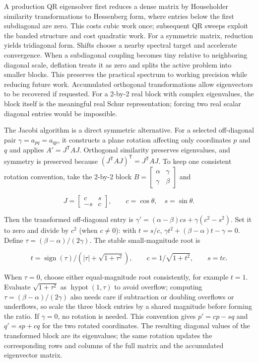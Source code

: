 A production QR eigensolver first reduces a dense matrix by Householder similarity transformations to Hessenberg form, where entries below the first subdiagonal are zero. This costs cubic work once; subsequent QR sweeps exploit the banded structure and cost quadratic work. For a symmetric matrix, reduction yields tridiagonal form. Shifts choose a nearby spectral target and accelerate convergence. When a subdiagonal coupling becomes tiny relative to neighboring diagonal scale, deflation treats it as zero and splits the active problem into smaller blocks. This preserves the practical spectrum to working precision while reducing future work. Accumulated orthogonal transformations allow eigenvectors to be recovered if requested. For a 2-by-2 real block with complex eigenvalues, the block itself is the meaningful real Schur representation; forcing two real scalar diagonal entries would be impossible.

The Jacobi algorithm is a direct symmetric alternative. For a selected off-diagonal pair \(\gamma=a_{pq}=a_{qp}\), it constructs a plane rotation affecting only coordinates \(p\) and \(q\) and applies \(A'=J^\mathsf TAJ\). Orthogonal similarity preserves eigenvalues, and symmetry is preserved because \((J^\mathsf TAJ)^\mathsf T=J^\mathsf TAJ\). To keep one consistent rotation convention, take the 2-by-2 block \(B=\begin{bmatrix}\alpha&\gamma\\\gamma&\beta\end{bmatrix}\) and

\[
J=\begin{bmatrix}c&s\\-s&c\end{bmatrix},\qquad c=\cos\theta,\quad s=\sin\theta.
\]

Then the transformed off-diagonal entry is \(\gamma'=(\alpha-\beta)cs+\gamma(c^2-s^2)\). Set it to zero and divide by \(c^2\) (when \(c\ne0\)): with \(t=s/c\), \(\gamma t^2+(\beta-\alpha)t-\gamma=0\). Define \(\tau=(\beta-\alpha)/(2\gamma)\). The stable small-magnitude root is

\[
t=\operatorname{sign}(\tau)\big/(|\tau|+\sqrt{1+\tau^2}),\qquad c=1/\sqrt{1+t^2},\qquad s=tc.
\]

When \(\tau=0\), choose either equal-magnitude root consistently, for example \(t=1\). Evaluate \(\sqrt{1+\tau^2}\) as \(\operatorname{hypot}(1,\tau)\) to avoid overflow; computing \(\tau=(\beta-\alpha)/(2\gamma)\) also needs care if subtraction or doubling overflows or underflows, so scale the three block entries by a shared magnitude before forming the ratio. If \(\gamma=0\), no rotation is needed. This convention gives \(p'=cp-sq\) and \(q'=sp+cq\) for the two rotated coordinates. The resulting diagonal values of the transformed block are its eigenvalues; the same rotation updates the corresponding rows and columns of the full matrix and the accumulated eigenvector matrix.

